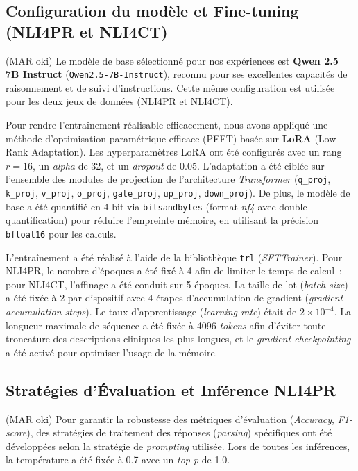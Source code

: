 \subsection{Configuration du modèle et Fine-tuning (NLI4PR et NLI4CT)} (MAR oki)
Le modèle de base sélectionné pour nos expériences est \textbf{Qwen 2.5 7B Instruct} (\texttt{Qwen2.5-7B-Instruct}), reconnu pour ses excellentes capacités de raisonnement et de suivi d'instructions. Cette même configuration est utilisée pour les deux jeux de données (NLI4PR et NLI4CT).

Pour rendre l'entraînement réalisable efficacement, nous avons appliqué une méthode d'optimisation paramétrique efficace (PEFT) basée sur \textbf{LoRA} (Low-Rank Adaptation). Les hyperparamètres LoRA ont été configurés avec un rang $r=16$, un \textit{alpha} de 32, et un \textit{dropout} de 0.05. L'adaptation a été ciblée sur l'ensemble des modules de projection de l'architecture \textit{Transformer} (\texttt{q\_proj}, \texttt{k\_proj}, \texttt{v\_proj}, \texttt{o\_proj}, \texttt{gate\_proj}, \texttt{up\_proj}, \texttt{down\_proj}). De plus, le modèle de base a été quantifié en 4-bit via \texttt{bitsandbytes} (format \textit{nf4} avec double quantification) pour réduire l'empreinte mémoire, en utilisant la précision \texttt{bfloat16} pour les calculs.

L'entraînement a été réalisé à l'aide de la bibliothèque \texttt{trl} (\textit{SFTTrainer}). Pour NLI4PR, le nombre d'époques a été fixé à 4 afin de limiter le temps de calcul~; pour NLI4CT, l'affinage a été conduit sur 5 époques. La taille de lot (\textit{batch size}) a été fixée à 2 par dispositif avec 4 étapes d'accumulation de gradient (\textit{gradient accumulation steps}). Le taux d'apprentissage (\textit{learning rate}) était de $2 \times 10^{-4}$. La longueur maximale de séquence a été fixée à 4096 \textit{tokens} afin d'éviter toute troncature des descriptions cliniques les plus longues, et le \textit{gradient checkpointing} a été activé pour optimiser l'usage de la mémoire.

\subsection{Stratégies d'Évaluation et Inférence NLI4PR} (MAR oki)
Pour garantir la robustesse des métriques d'évaluation (\textit{Accuracy}, \textit{F1-score}), des stratégies de traitement des réponses (\textit{parsing}) spécifiques ont été développées selon la stratégie de \textit{prompting} utilisée. Lors de toutes les inférences, la température a été fixée à 0.7 avec un \textit{top-p} de 1.0.

